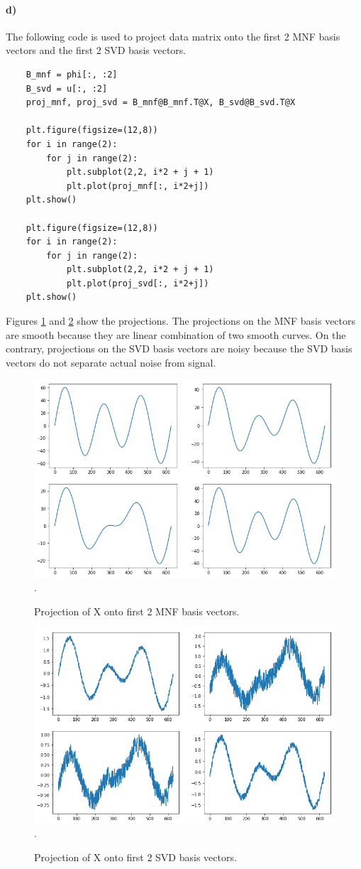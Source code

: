 \documentclass{article}
\begin{document}
\paragraph{d)} The following code is used to project data matrix onto the first 2 MNF basis vectors and the first 2 SVD basis vectors. 
\begin{lstlisting}
	B_mnf = phi[:, :2]
	B_svd = u[:, :2]
	proj_mnf, proj_svd = B_mnf@B_mnf.T@X, B_svd@B_svd.T@X

	plt.figure(figsize=(12,8))
	for i in range(2):
	    for j in range(2):
	        plt.subplot(2,2, i*2 + j + 1)
	        plt.plot(proj_mnf[:, i*2+j])
	plt.show()

	plt.figure(figsize=(12,8))
	for i in range(2):
	    for j in range(2):
	        plt.subplot(2,2, i*2 + j + 1)
	        plt.plot(proj_svd[:, i*2+j])
	plt.show()
\end{lstlisting}
Figures \ref{fig:proj_mnf} and \ref{fig:proj_svd} show the projections. The projections on the MNF basis vectors are smooth because they are linear combination of two smooth curves. On the contrary, projections on the SVD basis vectors are noisy because the SVD basis vectors do not separate actual noise from signal. 
\begin{figure}[h!]
\centering
\includegraphics[width=\linewidth]{../images/2d1.png}.
\caption{Projection of X onto first 2 MNF basis vectors.}
\label{fig:proj_mnf}
\end{figure}
\begin{figure}[h!]
\centering
\includegraphics[width=\linewidth]{../images/2d2.png}.
\caption{Projection of X onto first 2 SVD basis vectors.}
\label{fig:proj_svd}
\end{figure}
\end{document}
